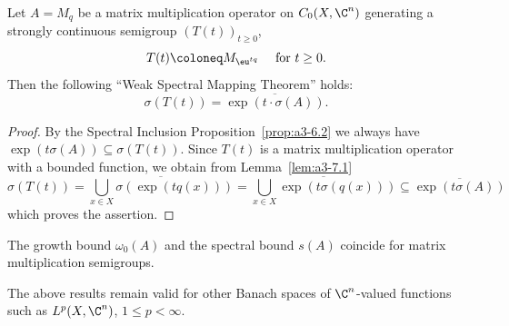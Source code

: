\begin{theorem}\label{thm:a3-7.2}
Let $A = M_{q}$ be a matrix multiplication operator on $C_{0}(X,\C^{n})$ generating a strongly continuous semigroup $(T(t))_{t\geq 0}$, 
%
\[
	T(t) \coloneq M_{\eu^{ t q} } \quad \text{ for $t \geq 0$.}
\]
%
Then the following \enquote{Weak Spectral Mapping Theorem}  holds: 
\[
	\sigma(T(t)) = \overline{ \exp( t \cdot \sigma(A) ) } .
\]
\end{theorem}
\begin{proof}
By the Spectral Inclusion Proposition~\ref{prop:a3-6.2} we always have $\exp(t\sigma(A)) \subseteq \sigma(T(t))$.
Since $T(t)$ is a matrix multiplication operator with a bounded function, we obtain from Lemma~\ref{lem:a3-7.1}
\[
\sigma(T(t)) = \overline{\bigcup_{x\in X} \sigma(\exp(tq(x)))} = \overline{\bigcup_{x\in X} \exp(t\sigma(q(x)))} \subseteq \overline{\exp(t\sigma(A))}
\]
which proves the assertion.
\end{proof}
\begin{corollary}\label{cor:a3-7.3}
The growth bound $\omega_{0}(A)$ and the spectral bound $s(A)$ coincide for matrix multiplication semigroups.
\end{corollary}
The above results remain valid for other Banach spaces of\/ $\C^{n}$-valued functions such as $L^{p}(X,\C^{n})$, $1 \leq p < \infty$.

